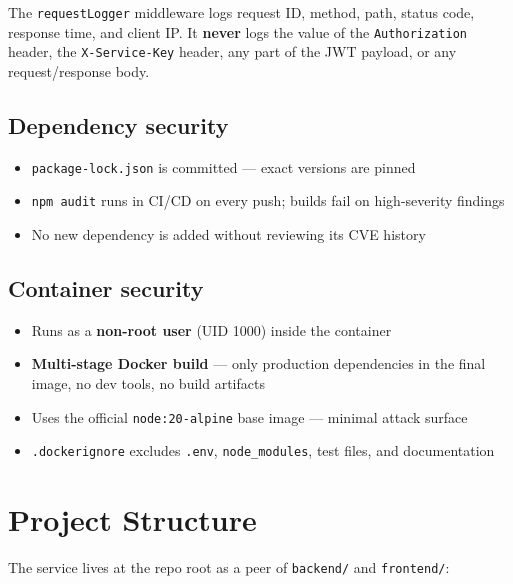 \documentclass[11pt]{article}
\begin{document}
The \texttt{requestLogger} middleware logs request ID, method, path, status code, response
time, and client IP. It \textbf{never} logs the value of the \texttt{Authorization} header,
the \texttt{X-Service-Key} header, any part of the JWT payload, or any request/response body.

\subsection{Dependency security}

\begin{itemize}
  \item \texttt{package-lock.json} is committed --- exact versions are pinned
  \item \texttt{npm audit} runs in CI/CD on every push; builds fail on high-severity findings
  \item No new dependency is added without reviewing its CVE history
\end{itemize}

\subsection{Container security}

\begin{itemize}
  \item Runs as a \textbf{non-root user} (UID 1000) inside the container
  \item \textbf{Multi-stage Docker build} --- only production dependencies in the final image,
        no dev tools, no build artifacts
  \item Uses the official \texttt{node:20-alpine} base image --- minimal attack surface
  \item \texttt{.dockerignore} excludes \texttt{.env}, \texttt{node\_modules}, test files,
        and documentation
\end{itemize}

\section{Project Structure}

The service lives at the repo root as a peer of \texttt{backend/} and \texttt{frontend/}:
\end{document}
